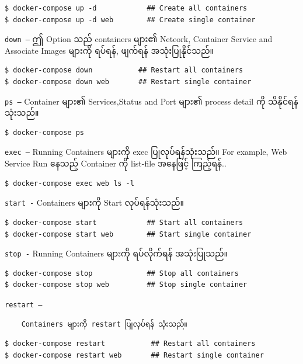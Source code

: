 \documentclass[]{article}
\begin{document}
\begin{verbatim}
$ docker-compose up -d            ## Create all containers
$ docker-compose up -d web        ## Create single container
\end{verbatim}

\texttt{down\ –} ဤ Option သည် containers များ၏ Neteork, Container
Service and Associate Images များကို ရပ်ရန်, ဖျက်ရန် အသုံးပြုနိုင်သည်။

\begin{verbatim}
$ docker-compose down           ## Restart all containers
$ docker-compose down web       ## Restart single container
\end{verbatim}

\texttt{ps\ –} Container များ၏ Services,Status and Port များ၏ process
detail ကို သိနိုင်ရန် သုံးသည်။

\begin{verbatim}
$ docker-compose ps
\end{verbatim}

\texttt{exec\ –} Running Containers များကို exec ပြုလုပ်ရန်သုံးသည်။ For
example, Web Service Run နေသည့် Container ကို list-file အနေဖြင့်
ကြည့်ရန်..

\begin{verbatim}
$ docker-compose exec web ls -l
\end{verbatim}

\texttt{start\ -} Containers များကို Start လုပ်ရန်သုံးသည်။

\begin{verbatim}
$ docker-compose start            ## Start all containers
$ docker-compose start web        ## Start single container
\end{verbatim}

\texttt{stop\ -} Running Containers များကို ရပ်လိုက်ရန် အသုံးပြုသည်။

\begin{verbatim}
$ docker-compose stop             ## Stop all containers
$ docker-compose stop web         ## Stop single container
\end{verbatim}

\texttt{restart\ –}

\begin{verbatim}
    Containers များကို restart ပြုလုပ်ရန် သုံးသည်။
\end{verbatim}

\begin{verbatim}
$ docker-compose restart           ## Restart all containers
$ docker-compose restart web       ## Restart single container
\end{verbatim}
\end{document}
